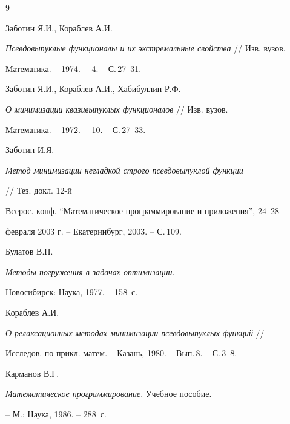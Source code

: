 \begin{thebibliography}{9}







Заботин Я.И., Кораблев А.И.


{\em Псевдовыпуклые функционалы и их экстремальные свойства} // Изв. вузов.


Математика. -- 1974. -- \No\,4. -- С.\,27--31.







Заботин Я.И., Кораблев А.И., Хабибуллин Р.Ф.


{\em О минимизации квазивыпуклых функционалов} // Изв. вузов.


Математика. -- 1972. -- \No\,10. -- С.\,27--33.







Заботин И.Я.


{\em Метод минимизации негладкой строго псевдовыпуклой функции}


// Тез. докл. 12-й


Всерос. конф. ``Математическое программирование и приложения'', 24--28


февраля 2003 г. -- Екатеринбург, 2003. -- С.\,109.







Булатов В.П.


{\em Методы погружения в задачах оптимизации}. --


Новосибирск: Наука, 1977. -- 158~с.







Кораблев А.И.


{\em О релаксационных методах минимизации псевдовыпуклых функций} //


Исследов. по прикл. матем. -- Казань, 1980. -- Вып.\,8. -- С.\,3--8.







Карманов В.Г.


{\em Математическое программирование}. Учебное пособие.


-- М.: Наука, 1986. -- 288~с.





\end{thebibliography}





\vskip 2cm












\label{end}





